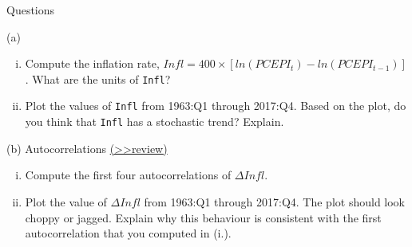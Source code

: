 \documentclass[
  10pt,
  ignorenonframetext,
]{beamer}
\begin{document}
\begin{frame}[fragile]{Questions}
\protect\hypertarget{questions}{}
\begin{block}{(a)}
\protect\hypertarget{a}{}
\begin{enumerate}
[i.]
\item
  Compute the inflation rate,
  \(Infl = 400 \times [ln(PCEPI_t) - ln(PCEPI_{t-1})]\). What are the
  units of \texttt{Infl}?
\item
  Plot the values of \texttt{Infl} from 1963:Q1 through 2017:Q4. Based
  on the plot, do you think that \texttt{Infl} has a stochastic trend?
  Explain.
\end{enumerate}

\vspace{1mm}
\end{block}

\begin{block}{(b) Autocorrelations
\footnotesize\protect\hyperlink{Autocorr}{(\textgreater\textgreater review)}
\normalsize}
\protect\hypertarget{b-autocorrelations-review}{}
\begin{enumerate}
[i.]
\item
  Compute the first four autocorrelations of \(\Delta Infl\).
\item
  Plot the value of \(\Delta Infl\) from 1963:Q1 through 2017:Q4. The
  plot should look choppy or jagged. Explain why this behaviour is
  consistent with the first autocorrelation that you computed in (i.).
\end{enumerate}
\end{block}
\end{frame}
\end{document}
